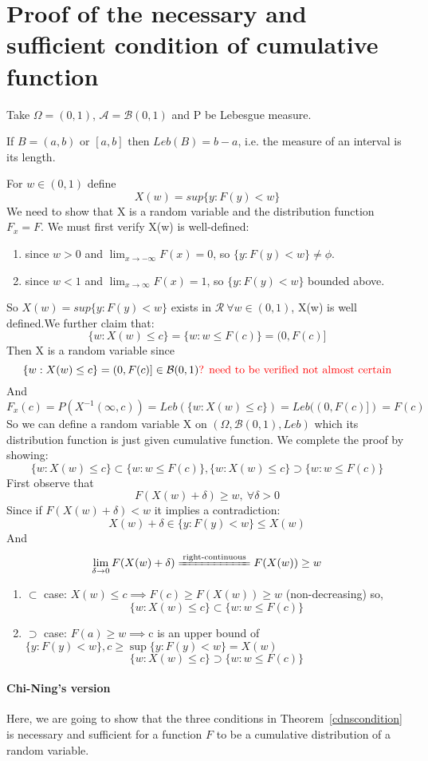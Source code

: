 \documentclass[Probability_Theory.tex]{subfiles}
\begin{document}
\section{Proof of the necessary and sufficient condition of cumulative function}\label{sec:proofcfnscondition}

Take $\Omega=(0,1)$, $\mathcal{A}=\mathcal{B}(0,1)$ and P be Lebesgue measure.
\begin{remark}
If $B=(a,b)\text{ or }[a,b] \text{ then } Leb(B)=b-a$, i.e. the measure of an interval is its length.
\end{remark}
For $w\in(0,1)$ define $$X(w)=sup\{y:F(y)<w\}$$
We need to show that X is a random variable and the distribution function $F_x=F$.
We must first verify X(w) is well-defined:
\begin{enumerate}
\item since $w>0$ and $\lim_{x\rightarrow -\infty}F(x)=0$, so $\{y:F(y)<w\}\neq\phi$.
\item since $w<1$ and $\lim_{x\rightarrow \infty}F(x)=1$, so $\{y:F(y)<w\}$ bounded above.
\end{enumerate}
So $X(w)=sup\{y:F(y)<w\}$ exists in $\mathcal{R} \ \forall w\in(0,1)$, X(w) is well defined.We further claim that:
$$\{w:X(w)\leq c\}=\{w:w\leq F(c)\}=(0,F(c)]$$ 
Then X is a random variable since $$\{w:X(w)\leq c\}=(0,F(c)]\in \mathcal{B}(0,1) \text{\textcolor{red}{? need to be verified not almost certain}} $$
And $$F_x(c)=P(X^{-1}(\infty,c))=Leb(\{w:X(w)\leq c\})=Leb((0,F(c)])=F(c)$$
So we can define a random variable X on $(\Omega,\mathcal{B}(0,1),Leb)$ which its distribution function is just given cumulative function. We complete the proof by showing:
$$\{w:X(w)\leq c\}\subset\{w:w\leq F(c)\},\{w:X(w)\leq c\}\supset\{w:w\leq F(c)\}$$
First observe that $$F(X(w)+\delta)\geq w,\ \forall \delta>0$$ Since if $F(X(w)+\delta)<w$ it implies a contradiction: $$X(w)+\delta\in\{y:F(y)<w\}\leq X(w)$$ And $$\lim_{\delta\rightarrow 0}F(X(w)+\delta)\xlongequal{\text{right-continuous}}F(X(w))\geq w$$  
\begin{enumerate}
\item $\subset$ case: $X(w)\leq c\implies F(c)\geq F(X(w))\geq w $ (non-decreasing) so, 
 $$\{w:X(w)\leq c\}\subset\{w:w\leq F(c)\}$$
\item $\supset$ case: $F(a)\geq w\implies$c is an upper bound of $\{y:F(y)<w\}, c\geq\sup\{y:F(y)<w\}=X(w)$
 $$\{w:X(w)\leq c\}\supset\{w:w\leq F(c)\}$$
\end{enumerate}

\paragraph{\color{red} Chi-Ning's version}
Here, we are going to show that the three conditions in Theorem~\ref{cdnscondition} is necessary and sufficient for a function $F$ to be a cumulative distribution of a random variable.
\end{document}
